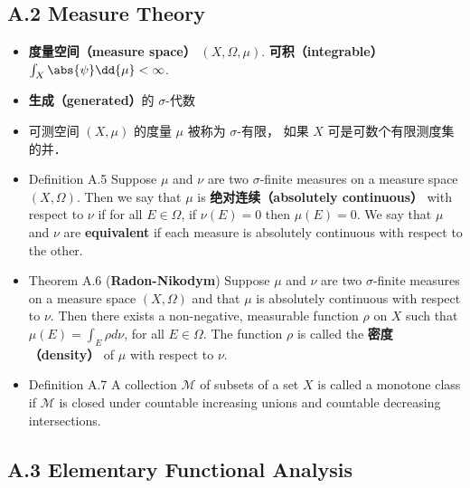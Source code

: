 
\subsection{A.2 Measure Theory}

\begin{itemize}
\item \textbf{度量空间（measure space）} $(X,\Omega,\mu)$. \textbf{可积（integrable）} $\int_X \abs{\psi} \dd{\mu} < \infty$.

\item \textbf{生成（generated）}的 $\sigma$-代数

\item 可测空间 $(X, \mu)$ 的度量 $\mu$ 被称为 $\sigma$-有限， 如果 $X$ 可是可数个有限测度集的并．

\item Definition A.5 Suppose $\mu$ and $\nu$ are two $\sigma$-finite measures on a measure space $(X, \Omega)$. Then we say that $\mu$ is \textbf{绝对连续（absolutely continuous）} with respect to $\nu$ if for all $E \in \Omega$, if $\nu(E)=0$ then $\mu(E)=0$. We say that $\mu$ and $\nu$ are \textbf{equivalent} if each measure is absolutely continuous with respect to the other.

\item Theorem A.6 (\textbf{Radon-Nikodym}) Suppose $\mu$ and $\nu$ are two $\sigma$-finite measures on a measure space $(X, \Omega)$ and that $\mu$ is absolutely continuous with respect to $\nu$. Then there exists a non-negative, measurable function $\rho$ on $X$ such that $\mu(E)=\int_{E} \rho d \nu$, for all $E \in \Omega$. The function $\rho$ is called the \textbf{密度（density）} of $\mu$ with respect to $\nu$.

\item Definition A.7 A collection $\mathcal{M}$ of subsets of a set $X$ is called a monotone class if $\mathcal{M}$ is closed under countable increasing unions and countable decreasing intersections.
\end{itemize}

\subsection{A.3 Elementary Functional Analysis}


